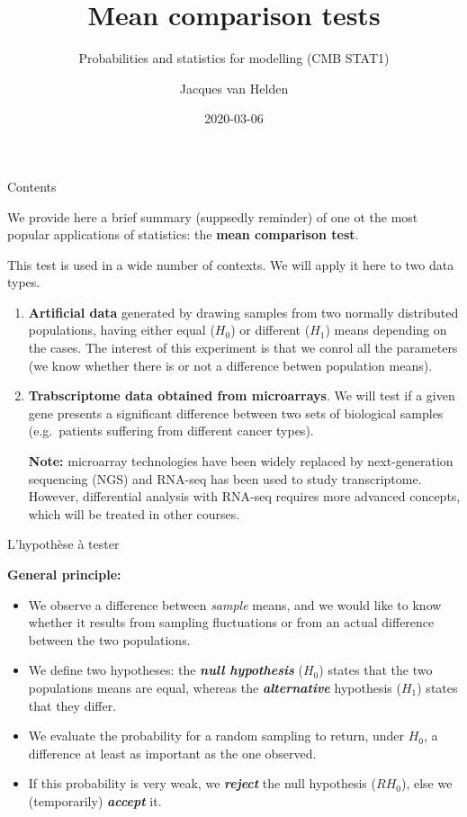 \documentclass[ignorenonframetext,]{beamer}
\title{Mean comparison tests}
\subtitle{Probabilities and statistics for modelling (CMB STAT1)}
\author{Jacques van Helden}
\date{2020-03-06}
\providecommand{\tightlist}{%
  \setlength{\itemsep}{0pt}\setlength{\parskip}{0pt}}
\begin{document}
\frame{\titlepage}

\begin{frame}
\tableofcontents[hideallsubsections]
\end{frame}
\begin{frame}{Contents}
\protect\hypertarget{contents}{}

We provide here a brief summary (suppsedly reminder) of one ot the most
popular applications of statistics: the \textbf{mean comparison test}.

This test is used in a wide number of contexts. We will apply it here to
two data types.

\begin{enumerate}
\item
  \textbf{Artificial data} generated by drawing samples from two
  normally distributed populations, having either equal (\(H_0\)) or
  different (\(H_1\)) means depending on the cases. The interest of this
  experiment is that we conrol all the parameters (we know whether there
  is or not a difference betwen population means).
\item
  \textbf{Trabscriptome data obtained from microarrays}. We will test if
  a given gene presents a significant difference between two sets of
  biological samples (e.g.~patients suffering from different cancer
  types).

  \textbf{Note:} microarray technologies have been widely replaced by
  next-generation sequencing (NGS) and RNA-seq has been used to study
  transcriptome. However, differential analysis with RNA-seq requires
  more advanced concepts, which will be treated in other courses.
\end{enumerate}

\end{frame}

\begin{frame}{L'hypothèse à tester}
\protect\hypertarget{lhypothuxe8se-uxe0-tester}{}

\textbf{General principle:}

\begin{itemize}
\tightlist
\item
  We observe a difference between \emph{sample} means, and we would like
  to know whether it results from sampling fluctuations or from an
  actual difference between the two populations.
\item
  We define two hypotheses: the \textbf{\emph{null hypothesis}}
  (\(H_0\)) states that the two populations means are equal, whereas the
  \textbf{\emph{alternative}} hypothesis (\(H_1\)) states that they
  differ.
\item
  We evaluate the probability for a random sampling to return, under
  \(H_0\), a difference at least as important as the one observed.\\
\item
  If this probability is very weak, we \textbf{\emph{reject}} the null
  hypothesis (\(RH_0\)), else we (temporarily) \textbf{\emph{accept}}
  it.
\end{itemize}

\end{frame}
\end{document}
